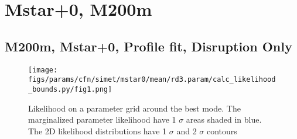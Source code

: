\documentclass[twocolumn]{article}
\begin{document}










\onecolumn
\section{Mstar+0, M200m}
\subsection{M200m, Mstar+0, Profile fit, Disruption Only}
\begin{figure}[H]
  \center\texttt{[image: figs/params/cfn/simet/mstar0/mean/rd3.param/calc\_likelihood\_bounds.py/fig1.png]}
  \caption{Likelihood on a parameter grid around the best mode. The marginalized parameter likelihood have
    1 $\sigma$ areas shaded in blue. The 2D likelihood distributions have 1 $\sigma$  and 2 $\sigma$ contours}
  \label{fig:basic_rd:likelihood}
\end{figure}
\end{document}
